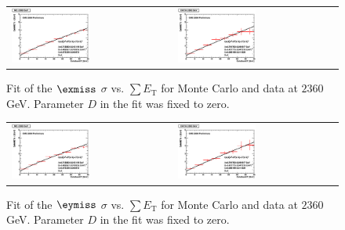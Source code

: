 \begin{figure}[h!]
 \centering
 \begin{tabular}{ll}
  \includegraphics[width=0.5\textwidth]{plots_DataVsMC_MB_2360GeV/final_metxsigma_sumet_MC_2360.eps} &
  \includegraphics[width=0.5\textwidth]{plots_DataVsMC_MB_2360GeV/final_metxsigma_sumet_DATA_2360.eps} \\
 \end{tabular}
 \caption{\small Fit of the $\exmiss$ $\sigma$ vs. $\sum E_\text{T}$ for Monte Carlo and data at $2360$ GeV. Parameter $D$ in the fit was fixed
          to zero.\label{fig:MExSigma_vs_SumET_2360_fit}}
\end{figure}

\begin{figure}[h!]
 \centering
 \begin{tabular}{ll}
  \includegraphics[width=0.5\textwidth]{plots_DataVsMC_MB_2360GeV/final_metysigma_sumet_MC_2360.eps} &
  \includegraphics[width=0.5\textwidth]{plots_DataVsMC_MB_2360GeV/final_metysigma_sumet_DATA_2360.eps} \\
 \end{tabular}
 \caption{\small Fit of the $\eymiss$ $\sigma$ vs. $\sum E_\text{T}$ for Monte Carlo and data at $2360$ GeV. Parameter $D$ in the fit was fixed
          to zero.\label{fig:MExSigma_vs_SumET_2360_fit}}
\end{figure}

